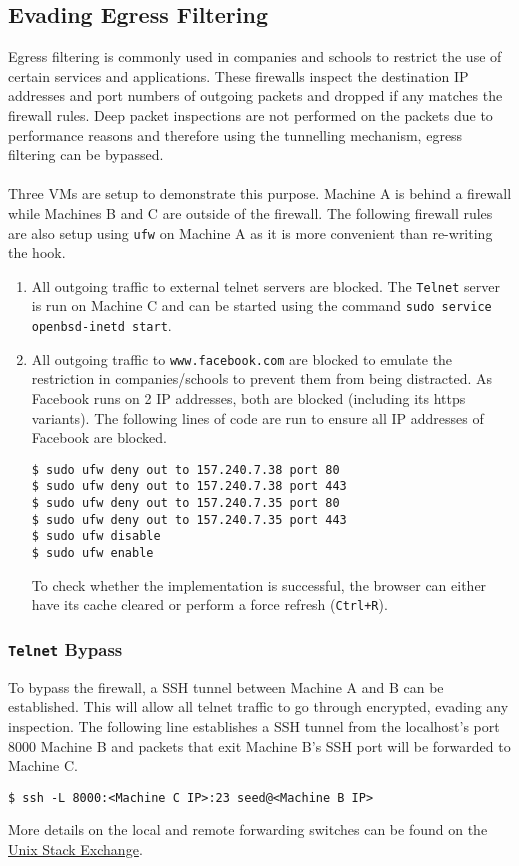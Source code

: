 \documentclass[a4paper,12pt]{article}
\begin{document}
\subsection{Evading Egress Filtering}
Egress filtering is commonly used in companies and schools to restrict the use of certain services and applications. These firewalls inspect the destination IP addresses and port numbers of outgoing packets and dropped if any matches the firewall rules. Deep packet inspections are not performed on the packets due to performance reasons and therefore using the tunnelling mechanism, egress filtering can be bypassed.\\\\
Three VMs are setup to demonstrate this purpose. Machine A is behind a firewall while Machines B and C are outside of the firewall. The following firewall rules are also setup using \texttt{ufw} on Machine A as it is more convenient than re-writing the hook.
\begin{enumerate}
\itemsep0em
\item All outgoing traffic to external telnet servers are blocked. The \texttt{Telnet} server is run on Machine C and can be started using the command \texttt{sudo service openbsd-inetd start}.
\item All outgoing traffic to \texttt{www.facebook.com} are blocked to emulate the restriction in companies/schools to prevent them from being distracted. As Facebook runs on 2 IP addresses, both are blocked (including its https variants). The following lines of code are run to ensure all IP addresses of Facebook are blocked.
\begin{verbatim}
$ sudo ufw deny out to 157.240.7.38 port 80
$ sudo ufw deny out to 157.240.7.38 port 443
$ sudo ufw deny out to 157.240.7.35 port 80
$ sudo ufw deny out to 157.240.7.35 port 443
$ sudo ufw disable
$ sudo ufw enable
\end{verbatim}
To check whether the implementation is successful, the browser can either have its cache cleared or perform a force refresh (\texttt{Ctrl+R}).
\end{enumerate}
\subsubsection{\texttt{Telnet} Bypass}
To bypass the firewall, a SSH tunnel between Machine A and B can be established. This will allow all telnet traffic to go through encrypted, evading any inspection. The following line establishes a SSH tunnel from the localhost's port 8000 Machine B and packets that exit Machine B's SSH port will be forwarded to Machine C.
\begin{verbatim}
$ ssh -L 8000:<Machine C IP>:23 seed@<Machine B IP>
\end{verbatim}
More details on the local and remote forwarding switches can be found on the \href{https://unix.stackexchange.com/questions/115897/whats-ssh-port-forwarding-and-whats-the-difference-between-ssh-local-and-remot}{Unix Stack Exchange}.
\end{document}
